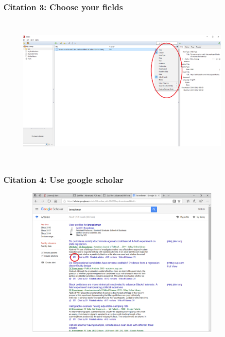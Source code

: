 \documentclass[12pt]{beamer}
\begin{document}
\begin{frame} \frametitle{Citation 3: Choose your fields} \begin{figure}[!h] \centering
	\includegraphics[height=3in, width = 4.25in,keepaspectratio]{zotero/citation_3.png}
\end{figure} \end{frame}

\begin{frame} \frametitle{Citation 4: Use google scholar} \begin{figure}[!h] \centering
	\includegraphics[height=3in, width = 4.25in,keepaspectratio]{zotero/citation_4.png}
\end{figure} \end{frame}
\end{document}
